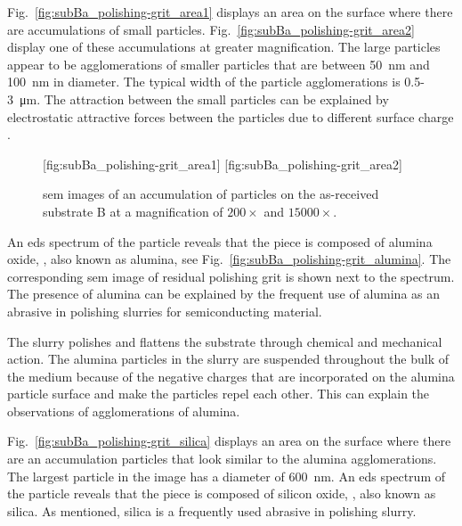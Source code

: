 Fig.~\ref{fig:subBa_polishing-grit_area1} displays an area on the surface where there are accumulations of small particles. Fig.~\ref{fig:subBa_polishing-grit_area2} display one of these accumulations at greater magnification. The large particles appear to be agglomerations of smaller particles that are between \SI{50}{\nano\metre} and \SI{100}{\nano\metre} in diameter. The typical width of the particle agglomerations is \SI{0.5}{}-\SI{3}{\micro\metre}. The attraction between the small particles can be explained by electrostatic attractive forces between the particles due to different surface charge \citep{allen2001review}.

\begin{figure}[htbp]
    \centering
        [fig:subBa_polishing-grit_area1]
        \hfill
        [fig:subBa_polishing-grit_area2]
    \caption[\Ac{sem} images of particles on substrate B.]{\Acf{sem} images of an accumulation of particles on the as-received substrate B at a magnification of  $200\times$ and  $15000\times$.}\label{fig:subBa_polishing-grit_area}
\end{figure}

An \ac{eds} spectrum of the particle reveals that the piece is composed of alumina oxide, , also known as alumina, see Fig.~\ref{fig:subBa_polishing-grit_alumina}. The corresponding \ac{sem} image of residual polishing grit is shown next to the spectrum. The presence of alumina can be explained by the frequent use of alumina as an abrasive in polishing slurries for semiconducting material.

The slurry polishes and flattens the substrate through chemical and mechanical action. The alumina particles in the slurry are suspended throughout the bulk of the medium because of the negative charges that are incorporated on the alumina particle surface and make the particles repel each other. This can explain the observations of agglomerations of alumina. 

Fig.~\ref{fig:subBa_polishing-grit_silica} displays an area on the surface where there are an accumulation particles that look similar to the alumina agglomerations. The largest particle in the image has a diameter of \SI{600}{\nano\metre}. An \ac{eds} spectrum of the particle reveals that the piece is composed of silicon oxide, , also known as silica. As mentioned, silica is a frequently used abrasive in polishing slurry.

